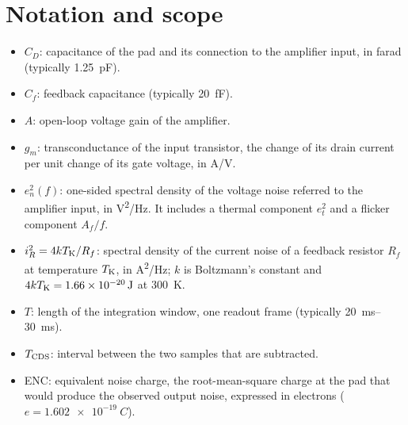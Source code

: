 \documentclass[11pt,a4paper]{article}
\newcommand{\CD}{\ensuremath{C_D}}
\newcommand{\Cf}{\ensuremath{C_f}}
\newcommand{\Tcds}{T_{\rm CDS}}
\begin{document}
\section{Notation and scope}
\label{sec:notation}
%
%
\begin{itemize}
\item $\CD$: capacitance of the pad and its connection to the amplifier
  input, in farad (typically \SI{1.25}{pF}).
\item $\Cf$: feedback capacitance (typically \SI{20}{fF}). 
\item $A$: open-loop voltage gain of the amplifier.
\item $g_m$: transconductance of the input transistor, the change of its
  drain current per unit change of its gate voltage, in \si{A/V}.
\item $e_n^2(f)$: one-sided spectral density of the voltage noise referred to
  the amplifier input, in \si{V^2/Hz}. It includes a thermal component $e_t^2$
  and a flicker component $A_f/f$. 
\item $i_R^2=4kT_{\rm K}/R_f$: spectral density of the current noise of a feedback
  resistor $R_f$ at temperature $T_{\rm K}$, in \si{A^2/Hz}; $k$ is
  Boltzmann's constant and $4kT_{\rm K}=\SI{1.66e-20}{J}$ at \SI{300}{K}.
\item $T$: length of the integration window, one readout frame (typically \SIrange{20}{30}{ms}). 
\item $\Tcds$: interval between the two samples that are subtracted. 
\item ENC: equivalent noise charge, the root-mean-square charge at the pad
  that would produce the observed output noise, expressed in electrons
  ($e=\SI{1.602e-19}{C}$).
\end{itemize}
%
\end{document}
